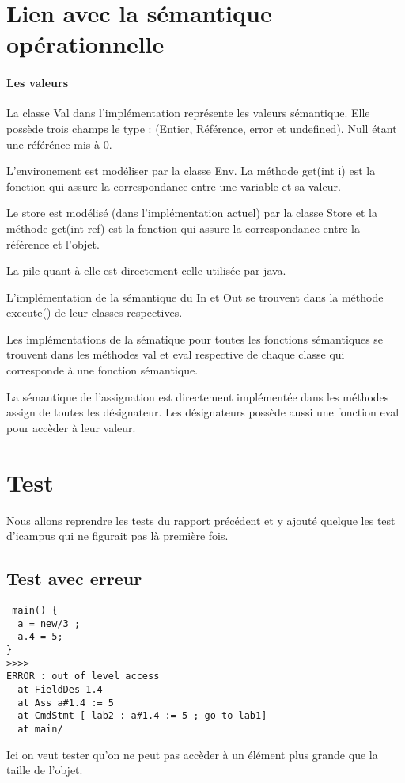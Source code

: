 \section{Lien avec la sémantique opérationnelle}
\paragraph{Les valeurs}
La classe Val dans l'implémentation représente les valeurs sémantique. Elle possède trois champs le type : (Entier, Référence, error et undefined). Null étant une référénce mis à 0.

L'environement est modéliser par la classe Env. La méthode get(int i)
est la fonction qui assure la correspondance entre une variable et sa valeur.

Le store est modélisé (dans l'implémentation actuel) par la classe Store et la méthode get(int ref) est la fonction qui assure la correspondance entre la référence et l'objet.

La pile quant à elle est directement celle utilisée par java.

L'implémentation de la sémantique du In et Out se trouvent dans la méthode execute() de leur classes respectives.

Les implémentations de la sématique pour toutes les fonctions sémantiques se trouvent dans les méthodes val et eval respective de chaque classe qui corresponde à une fonction sémantique.

La sémantique de l'assignation est directement implémentée dans les méthodes assign de toutes les désignateur. Les désignateurs possède aussi une fonction eval pour accèder à leur valeur.

\section{Test}
Nous allons reprendre les tests du rapport précédent et y ajouté quelque les test d'icampus qui ne figurait pas là première fois.
\subsection{Test avec erreur}
\begin{verbatim}
 main() {
  a = new/3 ;
  a.4 = 5;
}
>>>>
ERROR : out of level access
  at FieldDes 1.4
  at Ass a#1.4 := 5
  at CmdStmt [ lab2 : a#1.4 := 5 ; go to lab1]
  at main/
\end{verbatim}
Ici on veut tester qu'on ne peut pas accèder à un élément plus grande que la taille de l'objet.

